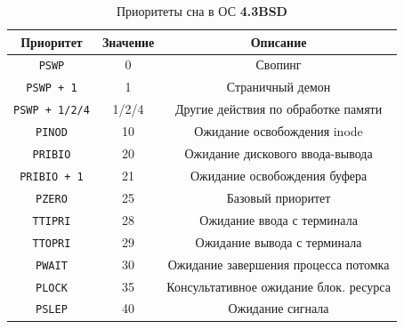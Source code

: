 \begin{table}[h]
	\captionsetup{justification=raggedright,singlelinecheck=off,margin=2mm}
	\caption{Приоритеты
		сна в ОС \textbf{4.3BSD}}
	\label{tab:bsd}
	\begin{center}
		\begin{tabular}{ |c|c|c|  }
			\hline
			\textbf{Приоритет} & \textbf{Значение} & \textbf{Описание} \\
			\hline
			\texttt{PSWP} & 0 & Свопинг \\
			\hline
			\texttt{PSWP + 1} & 1 & Страничный демон \\
			\hline	
			\texttt{PSWP + 1/2/4} & 1/2/4 & Другие действия по обработке памяти \\
			\hline
			\texttt{PINOD} & 10 & Ожидание освобождения inode \\
			\hline
			\texttt{PRIBIO} & 20 & Ожидание дискового ввода-вывода \\
			\hline
			\texttt{PRIBIO + 1} & 21 & Ожидание освобождения буфера \\
			\hline
			\texttt{PZERO} & 25 & Базовый приоритет \\
			\hline
			\texttt{TTIPRI} & 28 & Ожидание ввода с терминала \\
			\hline
			\texttt{TTOPRI} & 29 & Ожидание вывода с терминала \\
			\hline 
			\texttt{PWAIT} & 30 & Ожидание завершения процесса потомка \\
			\hline
			\texttt{PLOCK} & 35 & Консультативное ожидание блок. ресурса \\
			\hline
			\texttt{PSLEP} & 40 & Ожидание сигнала \\
			\hline
		\end{tabular}
	\end{center}
\end{table}







